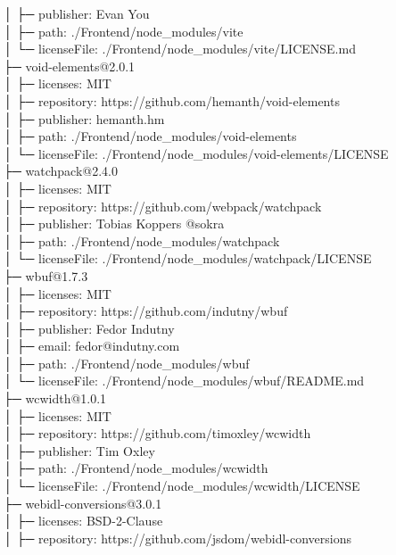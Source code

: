 \documentclass[
    paper=a4,
    twoside=false,
    parskip=half,
    listof=entryprefix,
    listof=totoc,
    index=totoc,
    bibliography=totoc,
    headsepline,
]{scrbook}
\begin{document}
    │  ├─ publisher: Evan You\\
    │  ├─ path: ./Frontend/node\_modules/vite\\
    │  └─ licenseFile: ./Frontend/node\_modules/vite/LICENSE.md\\
    ├─ void-elements@2.0.1\\
    │  ├─ licenses: MIT\\
    │  ├─ repository: https://github.com/hemanth/void-elements\\
    │  ├─ publisher: hemanth.hm\\
    │  ├─ path: ./Frontend/node\_modules/void-elements\\
    │  └─ licenseFile: ./Frontend/node\_modules/void-elements/LICENSE\\
    ├─ watchpack@2.4.0\\
    │  ├─ licenses: MIT\\
    │  ├─ repository: https://github.com/webpack/watchpack\\
    │  ├─ publisher: Tobias Koppers @sokra\\
    │  ├─ path: ./Frontend/node\_modules/watchpack\\
    │  └─ licenseFile: ./Frontend/node\_modules/watchpack/LICENSE\\
    ├─ wbuf@1.7.3\\
    │  ├─ licenses: MIT\\
    │  ├─ repository: https://github.com/indutny/wbuf\\
    │  ├─ publisher: Fedor Indutny\\
    │  ├─ email: fedor@indutny.com\\
    │  ├─ path: ./Frontend/node\_modules/wbuf\\
    │  └─ licenseFile: ./Frontend/node\_modules/wbuf/README.md\\
    ├─ wcwidth@1.0.1\\
    │  ├─ licenses: MIT\\
    │  ├─ repository: https://github.com/timoxley/wcwidth\\
    │  ├─ publisher: Tim Oxley\\
    │  ├─ path: ./Frontend/node\_modules/wcwidth\\
    │  └─ licenseFile: ./Frontend/node\_modules/wcwidth/LICENSE\\
    ├─ webidl-conversions@3.0.1\\
    │  ├─ licenses: BSD-2-Clause\\
    │  ├─ repository: https://github.com/jsdom/webidl-conversions\\
\end{document}
